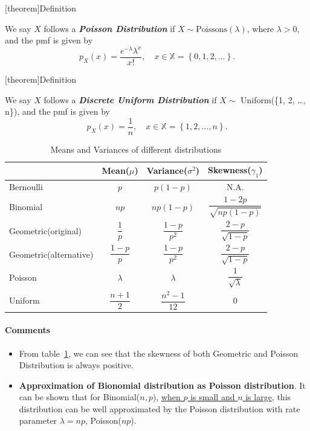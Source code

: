 \documentclass[12pt]{report}
\theoremstyle{definition}
\begin{document}
[theorem]{Definition}
\begin{poisson distribution}
    We say $X$ follows a \textbf{\emph{Poisson Distribution}} if
    $X\sim\text{Poissons}(\lambda)$, where $\lambda>0$, and the pmf is given by
    \[
        p_X(x)=\frac{e^{-\lambda}\lambda^{x}}{x!}, \quad
        x\in\mathbb{X}=\left\{0,1,2,\ldots\right\}.
    \]
\end{poisson distribution}

[theorem]{Definition}
\begin{discrete uniform distribution}
    We say $X$ follows a \textbf{\emph{Discrete Uniform Distribution}} if
    $X\sim$ Uniform(\{1, 2, \ldots, n\}), and the pmf is given by
    \[
        p_X(x)=\frac{1}{n}, \quad x\in\mathbb{X}=\left\{1,2,\ldots,n\right\}.
    \]
\end{discrete uniform distribution}

\begin{table}[h]
    \centering
    \caption{Means and Variances of different distributions}
    \label{mean_var_of_distributions}
    \def\arraystretch{2.3}
    \begin{tabular}{l||c|c|c}
        & Mean($\mu$) & Variance($\sigma^{2}$) & Skewness($\gamma_1$) \\
        \hline\hline
        Bernoulli & $p$ & $p(1-p)$ & N.A. \\
        Binomial & $np$ & $np(1-p)$ & $\dfrac{1-2p}{\sqrt{np(1-p)}}$ \\
        Geometric(original) & $\dfrac{1}{p}$ & $\dfrac{1-p}{p^{2}}$ &
        $\dfrac{2-p}{\sqrt{1-p}}$ \\
        Geometric(alternative) & $\dfrac{1-p}{p}$ & $\dfrac{1-p}{p^{2}}$
                               & $\dfrac{2-p}{\sqrt{1-p}}$ \\
        Poisson & $\lambda$ & $\lambda$ & $\dfrac{1}{\sqrt{\lambda}}$ \\
        Uniform & $\dfrac{n+1}{2}$ & $\dfrac{n^{2}-1}{12}$ & 0
    \end{tabular}
\end{table}

\paragraph{Comments} 
\begin{itemize}
    \item 
        From table~\ref{mean_var_of_distributions},
        we can see that the skewness of both Geometric and Poisson Distribution 
        is always positive.
    \item \textbf{Approximation of Bionomial distribution as Poisson
        distribution}.
        It can be shown that for Binomial($n,p$), 
        \underline{when $p$ is small and $n$ is large},
        this distribution can be well approximated by the Poisson
        distribution with rate parameter $\lambda=np$, Poisson($np$).
\end{itemize} 
\end{document}
